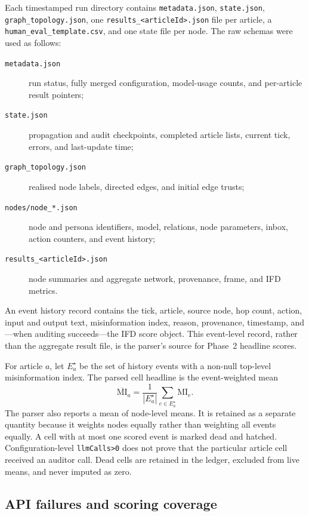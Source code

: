 Each timestamped run directory contains \texttt{metadata.json},
\texttt{state.json}, \texttt{graph\_topology.json}, one
\texttt{results\_<articleId>.json} file per article, a
\texttt{human\_eval\_template.csv}, and one state file per node.  The raw
schemas were used as follows:
\begin{description}
  \item[\texttt{metadata.json}] run status, fully merged configuration,
  model-usage counts, and per-article result pointers;
  \item[\texttt{state.json}] propagation and audit checkpoints, completed
  article lists, current tick, errors, and last-update time;
  \item[\texttt{graph\_topology.json}] realised node labels, directed edges,
  and initial edge trusts;
  \item[\texttt{nodes/node\_*.json}] node and persona identifiers, model,
  relations, node parameters, inbox, action counters, and event history;
  \item[\texttt{results\_<articleId>.json}] node summaries and aggregate
  network, provenance, frame, and IFD metrics.
\end{description}
An event history record contains the tick, article, source node, hop count,
action, input and output text, misinformation index, reason, provenance,
timestamp, and---when auditing succeeds---the IFD score object.  This
event-level record, rather than the aggregate result file, is the parser's
source for Phase~2 headline scores.

For article \(a\), let \(E_a^\star\) be the set of history events with a
non-null top-level misinformation index.  The parsed cell headline is the
event-weighted mean
\begin{equation}
  \overline{\mathrm{MI}}_a
  = \frac{1}{|E_a^\star|}
    \sum_{e\in E_a^\star}\mathrm{MI}_e.
  \label{eq:cell-mean-mi}
\end{equation}
The parser also reports a mean of node-level means.  It is retained as a
separate quantity because it weights nodes equally rather than weighting all
events equally.  A cell with at most one scored event is marked dead and
hatched. Configuration-level \texttt{llmCalls>0} does not prove that the
particular article cell received an auditor call. Dead cells are retained in
the ledger, excluded from live means, and never imputed as zero.

\subsection{API failures and scoring coverage}
\label{subsec:api-failures}


